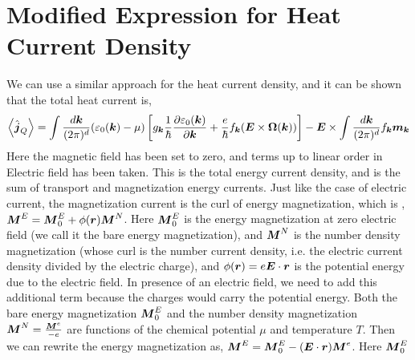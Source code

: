\documentclass{report}
\renewcommand\vec[1]{\ensuremath\boldsymbol{#1}} %
\begin{document}
\section{Modified Expression for Heat Current Density}
We can use a similar approach for the heat current density, and it can be shown that \cite{PhysRevLett.97.026603} the total heat current is,
\begin{equation} \label{Eq:heat-current-simplified-including-magnetization}
	\expval{\hat{\vec{j}}_Q} = \int \frac{d\vec{k}}{(2\pi)^d} (\varepsilon_0(\vec{k}) - \mu) \left[ {g}_{\vec{k}} \frac{1}{\hbar} \frac{\partial \varepsilon_0(\vec{k})}{\partial \vec{k}} + \frac{e}{\hbar} {f}_{\vec{k}} (\vec{E}\times\vec{\Omega}(\vec{k}))\right]
	- \vec{E} \times \int \frac{d\vec{k}}{(2\pi)^d}
	 f_{\vec{k}} \vec{m}_{\vec{k}}
\end{equation}
Here the magnetic field has been set to zero, and terms up to linear order in Electric field has been taken. This is the total energy current density, and is the sum of transport and magnetization energy currents. Just like the case of electric current, the magnetization current is the curl of energy magnetization, which is \cite{CooperHalperin1997}, $\vec{M}^E = \vec{M}_0^E + \phi(\vec{r}) \vec{M}^N$. Here $\vec{M}_0^E$ is the energy magnetization at zero electric field (we call it the bare energy magnetization), and $\vec{M}^N$ is the number density magnetization (whose curl is the number current density, i.e. the electric current density divided by the electric charge), and $\phi(\vec{r}) = e \vec{E} \cdot \vec{r}$ is the potential energy due to the electric field. In presence of an electric field, we need to add this additional term because the charges would carry the potential energy. Both the bare energy magnetization $\vec{M}_0^E$ and the number density magnetization $\vec{M}^N = \frac{\vec{M}^e}{-e}$ are functions of the chemical potential $\mu$ and temperature $T$. Then we can rewrite the energy magnetization as, $\vec{M}^E = \vec{M}_0^E - (\vec{E}\cdot\vec{r}) \vec{M}^e$. Here $\vec{M}_0^E$
\end{document}
